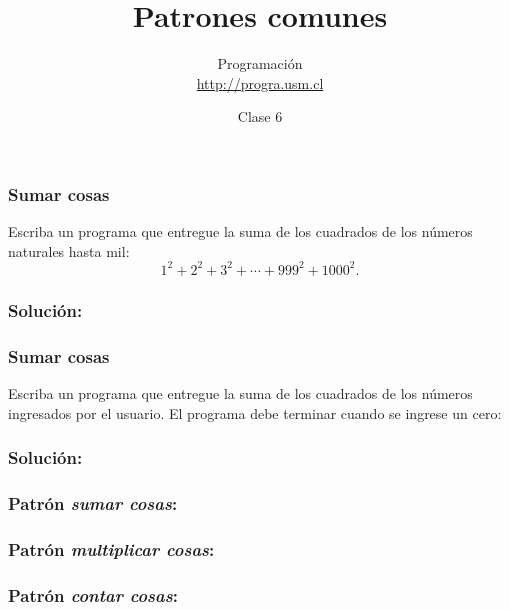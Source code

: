 \documentclass[12pt]{beamer}
\title{Patrones comunes}
\author{
  Programación \\ \url{http://progra.usm.cl}
}
\date{Clase 6}
\begin{document}
  \begin{frame}
    \maketitle
  \end{frame}

  \begin{frame}
    \frametitle{Sumar cosas}
    \label{problema-suma-cuadrados-menores-que-mil}
    Escriba un programa que entregue la suma
    de los cuadrados de los números naturales hasta mil:
    \[
      1^2 + 2^2 + 3^2 + \cdots + 999^2 + 1000^2.
    \]
  \end{frame}

  \begin{frame}
    \frametitle{Solución:}
    \label{solucion-suma-cuadrados-menores-que-mil}
    
  \end{frame}

  \begin{frame}
    \frametitle{Sumar cosas}
    \label{problema-suma-cuadrados-hasta-cero}
    Escriba un programa que entregue la suma
    de los cuadrados de los números ingresados por el usuario.
    El programa debe terminar
    cuando se ingrese un cero:
    
  \end{frame}

  \begin{frame}
    \frametitle{Solución:}
    \label{solucion-suma-cuadrados-hasta-cero}
    
  \end{frame}

  \begin{frame}
    \frametitle{Patrón \emph{sumar cosas}:}
    \label{patron-sumar}
    
  \end{frame}

  \begin{frame}
    \frametitle{Patrón \emph{multiplicar cosas}:}
    \label{patron-multiplicar}
    
  \end{frame}

  \begin{frame}
    \frametitle{Patrón \emph{contar cosas}:}
    \label{patron-contar}
    
  \end{frame}
\end{document}
